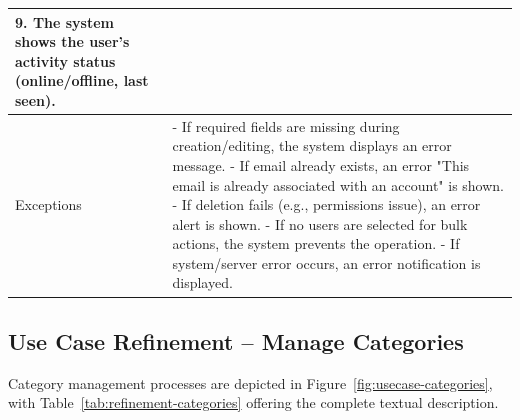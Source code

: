 \begin{table}[H]
\begin{tabular}{|p{3cm}|p{12cm}|}
9. The system shows the user's activity status (online/offline, last seen). \\
\hline
Exceptions & 
- If required fields are missing during creation/editing, the system displays an error message. \newline
- If email already exists, an error "This email is already associated with an account" is shown. \newline
- If deletion fails (e.g., permissions issue), an error alert is shown. \newline
- If no users are selected for bulk actions, the system prevents the operation. \newline
- If system/server error occurs, an error notification is displayed. \\
\hline
\end{tabular}
\end{table}

\subsection{Use Case Refinement -- Manage Categories}

Category management processes are depicted in Figure~\ref{fig:usecase-categories}, with Table~\ref{tab:refinement-categories} offering the complete textual description.


